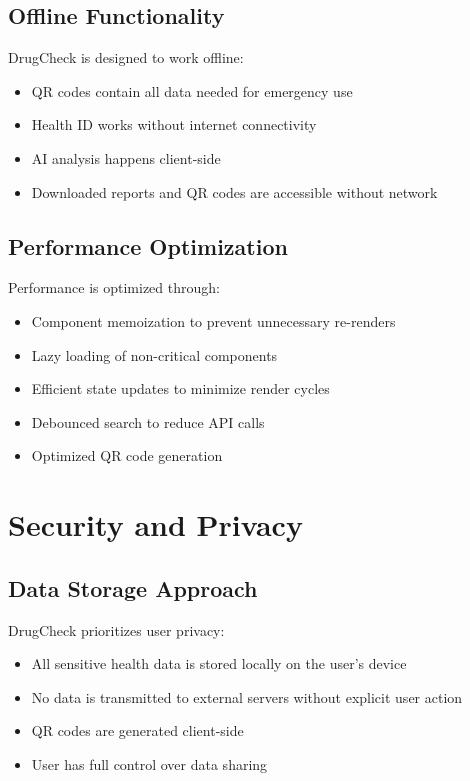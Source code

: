 \documentclass[12pt,a4paper]{report}
\begin{document}
\section{Offline Functionality}
DrugCheck is designed to work offline:
\begin{itemize}
    \item QR codes contain all data needed for emergency use
    \item Health ID works without internet connectivity
    \item AI analysis happens client-side
    \item Downloaded reports and QR codes are accessible without network
\end{itemize}

\section{Performance Optimization}
Performance is optimized through:
\begin{itemize}
    \item Component memoization to prevent unnecessary re-renders
    \item Lazy loading of non-critical components
    \item Efficient state updates to minimize render cycles
    \item Debounced search to reduce API calls
    \item Optimized QR code generation
\end{itemize}

\chapter{Security and Privacy}

\section{Data Storage Approach}
DrugCheck prioritizes user privacy:
\begin{itemize}
    \item All sensitive health data is stored locally on the user's device
    \item No data is transmitted to external servers without explicit user action
    \item QR codes are generated client-side
    \item User has full control over data sharing
\end{itemize}
\end{document}
